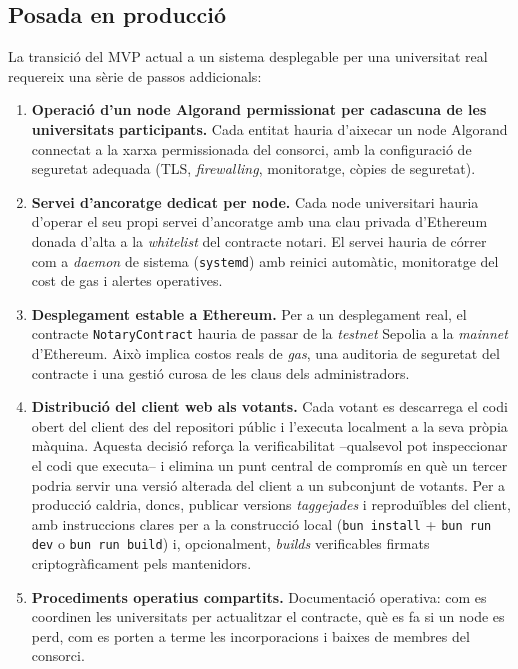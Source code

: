 \subsection{Posada en producció}

La transició del \ac{MVP} actual a un sistema desplegable per una
universitat real requereix una sèrie de passos addicionals:

\begin{enumerate}
    \item \textbf{Operació d'un node Algorand permissionat per
    cadascuna de les universitats participants.} Cada entitat hauria
    d'aixecar un node Algorand connectat a la xarxa permissionada del
    consorci, amb la configuració de seguretat adequada (TLS,
    \emph{firewalling}, monitoratge, còpies de seguretat).

    \item \textbf{Servei d'ancoratge dedicat per node.} Cada node
    universitari hauria d'operar el seu propi servei d'ancoratge amb
    una clau privada d'Ethereum donada d'alta a la \emph{whitelist}
    del contracte notari. El servei hauria de córrer com a \emph{daemon}
    de sistema (\texttt{systemd}) amb reinici automàtic, monitoratge
    del cost de gas i alertes operatives.

    \item \textbf{Desplegament estable a Ethereum.} Per a un
    desplegament real, el contracte \texttt{NotaryContract} hauria
    de passar de la \emph{testnet} Sepolia a la \emph{mainnet}
    d'Ethereum. Això implica costos reals de \emph{gas}, una auditoria
    de seguretat del contracte i una gestió curosa de les claus dels
    administradors.

    \item \textbf{Distribució del client web als votants.} Cada votant es descarrega el codi obert
    del client des del repositori públic \cite{demochainrepo} i
    l'executa localment a la seva pròpia màquina. Aquesta decisió
    reforça la verificabilitat --qualsevol pot inspeccionar el codi
    que executa-- i elimina un punt central de compromís en què un
    tercer podria servir una versió alterada del client a un subconjunt
    de votants. Per a producció caldria, doncs, publicar versions
    \emph{taggejades} i reproduïbles del client, amb instruccions
    clares per a la construcció local (\texttt{bun install} +
    \texttt{bun run dev} o \texttt{bun run build}) i, opcionalment,
    \emph{builds} verificables firmats criptogràficament pels
    mantenidors.

    \item \textbf{Procediments operatius compartits.} Documentació
    operativa: com es coordinen les universitats per actualitzar el
    contracte, què es fa si un node es perd, com es porten a terme les
    incorporacions i baixes de membres del consorci.
\end{enumerate}


